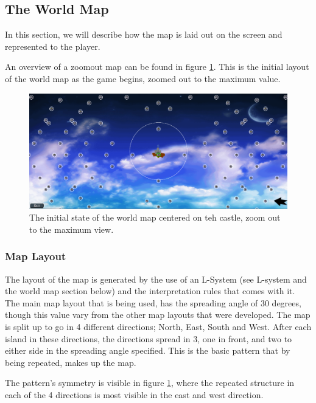\subsection{The World Map}
In this section, we will describe how the map is laid out on the screen and represented to the player.

An overview of a zoomout map can be found in figure \ref{fig:worldmapzoom}. This is the initial layout of the world map as the game begins, zoomed out to the maximum value.

\begin{figure}[!ht]
    \centering
    \includegraphics[width=\textwidth]{Images/WorldMapZoom.png}
    \caption{The initial state of the world map centered on teh castle, zoom out to the maximum view.}
    \label{fig:worldmapzoom}
\end{figure}

\subsubsection{Map Layout}
The layout of the map is generated by the use of an L-System (see L-system and the world map section below) and the interpretation rules that comes with it. The main map layout that is being used, has the spreading angle of 30 degrees, though this value vary from the other map layouts that were developed. The map is split up to go in 4 different directions; North, East, South and West. After each island in these directions, the directions spread in 3, one in front, and two to either side in the spreading angle specified. This is the basic pattern that by being repeated, makes up the map.

The pattern's symmetry is visible in figure \ref{fig:worldmapzoom}, where the repeated structure in each of the 4 directions is most visible in the east and west direction.

